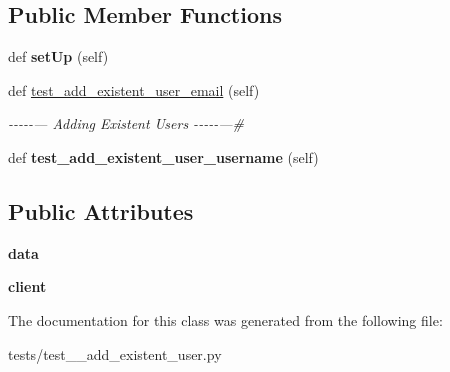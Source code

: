 \subsection*{Public Member Functions}
\begin{DoxyCompactItemize}
\item 
\mbox{\label{classtests_1_1test__2__add__existent__user_1_1_test_user_routes_a25c1a87e5087a939d9b2e515df71a387}} 
def {\bfseries set\+Up} (self)
\item 
\mbox{\label{classtests_1_1test__2__add__existent__user_1_1_test_user_routes_a8de1d56dc1f1146b054f51401ac37ae0}} 
def \hyperlink{classtests_1_1test__2__add__existent__user_1_1_test_user_routes_a8de1d56dc1f1146b054f51401ac37ae0}{test\+\_\+add\+\_\+existent\+\_\+user\+\_\+email} (self)
\begin{DoxyCompactList}\small\item\em -\/-\/-\/-\/-\/--- Adding Existent Users -\/-\/-\/-\/-\/---\# \end{DoxyCompactList}\item 
\mbox{\label{classtests_1_1test__2__add__existent__user_1_1_test_user_routes_ae1c1cf191182030649c30e21f8a53f42}} 
def {\bfseries test\+\_\+add\+\_\+existent\+\_\+user\+\_\+username} (self)
\end{DoxyCompactItemize}
\subsection*{Public Attributes}
\begin{DoxyCompactItemize}
\item 
\mbox{\label{classtests_1_1test__2__add__existent__user_1_1_test_user_routes_af61f77064477f9fc6be8a942b610274a}} 
{\bfseries data}
\item 
\mbox{\label{classtests_1_1test__2__add__existent__user_1_1_test_user_routes_ab663aac996acfbc5c9b89edf553a4c5b}} 
{\bfseries client}
\end{DoxyCompactItemize}


The documentation for this class was generated from the following file\+:\begin{DoxyCompactItemize}
\item 
tests/test\+\_\+\_\+add\+\_\+existent\+\_\+user.\+py\end{DoxyCompactItemize}
